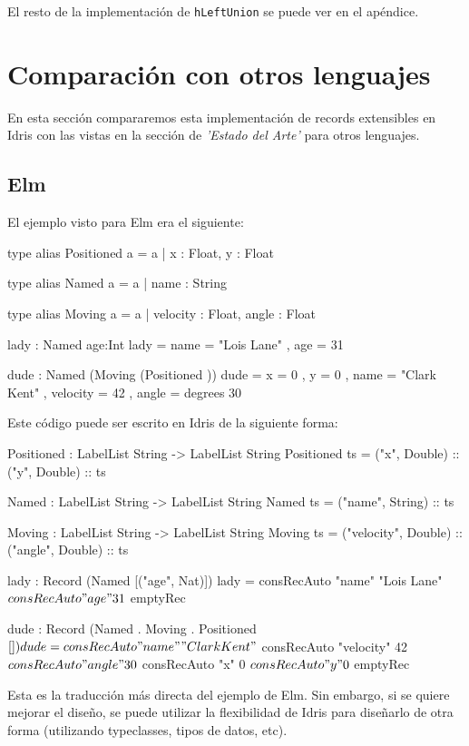 El resto de la implementación de \texttt{hLeftUnion} se puede ver en el apéndice.

\section{Comparación con otros lenguajes}

En esta sección compararemos esta implementación de records extensibles en Idris con las vistas en la sección de \textit{'Estado del Arte'} para otros lenguajes.

\subsection{Elm}

El ejemplo visto para Elm era el siguiente:

\begin{code}
type alias Positioned a =
  { a | x : Float, y : Float }

type alias Named a =
  { a | name : String }

type alias Moving a =
  { a | velocity : Float, angle : Float }

lady : Named { age:Int }
lady =
  { name = "Lois Lane"
  , age = 31
  }

dude : Named (Moving (Positioned {}))
dude =
  { x = 0
  , y = 0
  , name = "Clark Kent"
  , velocity = 42
  , angle = degrees 30
  }
\end{code}

Este código puede ser escrito en Idris de la siguiente forma:

\begin{code}
Positioned : LabelList String -> LabelList String 
Positioned ts = ("x", Double) :: ("y", Double) :: ts

Named : LabelList String -> LabelList String
Named ts = ("name", String) :: ts

Moving : LabelList String -> LabelList String
Moving ts = ("velocity", Double) :: ("angle", Double) :: ts

lady : Record (Named [("age", Nat)])
lady = consRecAuto "name" "Lois Lane" $
  consRecAuto "age" 31 $
  emptyRec  
      
dude : Record (Named . Moving . Positioned $ [])
dude = consRecAuto "name" "Clark Kent" $
  consRecAuto "velocity" 42 $
  consRecAuto "angle" 30 $
  consRecAuto "x" 0 $
  consRecAuto "y" 0 $
  emptyRec
\end{code}

Esta es la traducción más directa del ejemplo de Elm. Sin embargo, si se quiere mejorar el diseño, se puede utilizar la flexibilidad de Idris para diseñarlo de otra forma (utilizando typeclasses, tipos de datos, etc).

